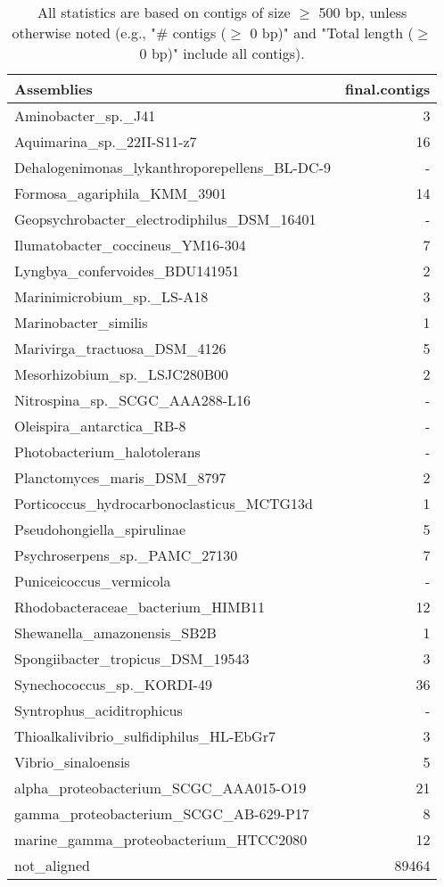 \documentclass[12pt,a4paper]{article}
\begin{document}
\begin{table}[ht]
\begin{center}
\caption{All statistics are based on contigs of size $\geq$ 500 bp, unless otherwise noted (e.g., "\# contigs ($\geq$ 0 bp)" and "Total length ($\geq$ 0 bp)" include all contigs).}
\begin{tabular}{|l*{1}{|r}|}
\hline
Assemblies & final.contigs \\ \hline
Aminobacter\_sp.\_J41 & 3 \\ \hline
Aquimarina\_sp.\_22II-S11-z7 & 16 \\ \hline
Dehalogenimonas\_lykanthroporepellens\_BL-DC-9 & - \\ \hline
Formosa\_agariphila\_KMM\_3901 & 14 \\ \hline
Geopsychrobacter\_electrodiphilus\_DSM\_16401 & - \\ \hline
Ilumatobacter\_coccineus\_YM16-304 & 7 \\ \hline
Lyngbya\_confervoides\_BDU141951 & 2 \\ \hline
Marinimicrobium\_sp.\_LS-A18 & 3 \\ \hline
Marinobacter\_similis & 1 \\ \hline
Marivirga\_tractuosa\_DSM\_4126 & 5 \\ \hline
Mesorhizobium\_sp.\_LSJC280B00 & 2 \\ \hline
Nitrospina\_sp.\_SCGC\_AAA288-L16 & - \\ \hline
Oleispira\_antarctica\_RB-8 & - \\ \hline
Photobacterium\_halotolerans & - \\ \hline
Planctomyces\_maris\_DSM\_8797 & 2 \\ \hline
Porticoccus\_hydrocarbonoclasticus\_MCTG13d & 1 \\ \hline
Pseudohongiella\_spirulinae & 5 \\ \hline
Psychroserpens\_sp.\_PAMC\_27130 & 7 \\ \hline
Puniceicoccus\_vermicola & - \\ \hline
Rhodobacteraceae\_bacterium\_HIMB11 & 12 \\ \hline
Shewanella\_amazonensis\_SB2B & 1 \\ \hline
Spongiibacter\_tropicus\_DSM\_19543 & 3 \\ \hline
Synechococcus\_sp.\_KORDI-49 & 36 \\ \hline
Syntrophus\_aciditrophicus & - \\ \hline
Thioalkalivibrio\_sulfidiphilus\_HL-EbGr7 & 3 \\ \hline
Vibrio\_sinaloensis & 5 \\ \hline
alpha\_proteobacterium\_SCGC\_AAA015-O19 & 21 \\ \hline
gamma\_proteobacterium\_SCGC\_AB-629-P17 & 8 \\ \hline
marine\_gamma\_proteobacterium\_HTCC2080 & 12 \\ \hline
not\_aligned & 89464 \\ \hline
\end{tabular}
\end{center}
\end{table}
\end{document}
